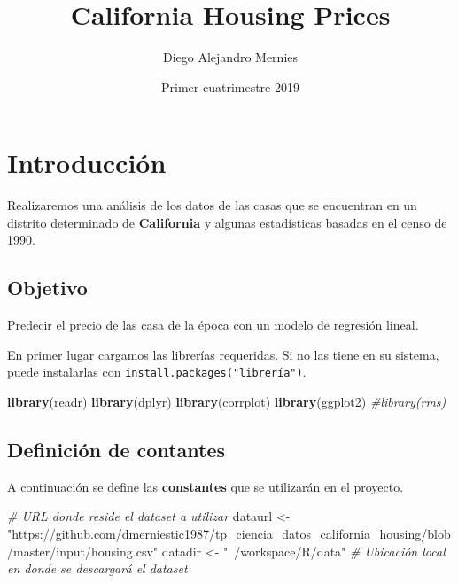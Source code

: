 \documentclass[]{article}
\title{California Housing Prices}
\author{Diego Alejandro Mernies}
\date{Primer cuatrimestre 2019}
\newenvironment{Shaded}{\begin{snugshade}}{\end{snugshade}}
\newcommand{\KeywordTok}[1]{\textcolor[rgb]{0.13,0.29,0.53}{\textbf{#1}}}
\newcommand{\StringTok}[1]{\textcolor[rgb]{0.31,0.60,0.02}{#1}}
\newcommand{\CommentTok}[1]{\textcolor[rgb]{0.56,0.35,0.01}{\textit{#1}}}
\newcommand{\NormalTok}[1]{#1}
\begin{document}
\maketitle

\section{Introducción}\label{introduccion}

Realizaremos una análisis de los datos de las casas que se encuentran en
un distrito determinado de \textbf{California} y algunas estadísticas
basadas en el censo de 1990.

\subsection{Objetivo}\label{objetivo}

Predecir el precio de las casa de la época con un modelo de regresión
lineal.

En primer lugar cargamos las librerías requeridas. Si no las tiene en su
sistema, puede instalarlas con \texttt{install.packages("librería")}.

\begin{Shaded}
\begin{Highlighting}[]
\KeywordTok{library}\NormalTok{(readr)}
\KeywordTok{library}\NormalTok{(dplyr)}
\KeywordTok{library}\NormalTok{(corrplot)}
\KeywordTok{library}\NormalTok{(ggplot2)}
\CommentTok{#library(rms)}
\end{Highlighting}
\end{Shaded}

\subsection{Definición de contantes}\label{definicion-de-contantes}

A continuación se define las \textbf{constantes} que se utilizarán en el
proyecto.

\begin{Shaded}
\begin{Highlighting}[]
\CommentTok{# URL donde reside el dataset a utilizar}
\NormalTok{dataurl <-}\StringTok{ "https://github.com/dmerniestic1987/tp_ciencia_datos_california_housing/blob/master/input/housing.csv"} 
\NormalTok{datadir <-}\StringTok{ "~/workspace/R/data"} \CommentTok{# Ubicación local en donde se descargará el dataset}
\end{Highlighting}
\end{Shaded}
\end{document}
